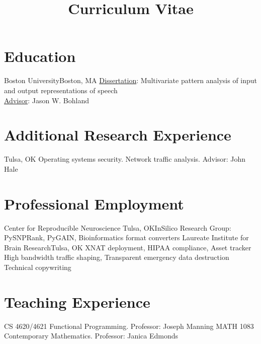 \documentclass[11pt,letterpaper,sans]{moderncv}
\title{Curriculum Vitae}
\begin{document}
\makecvtitle

\vspace{-1em}
\section{Education}
%
    {Boston University}{Boston, MA}{}%
    {\underline{Dissertation}: Multivariate pattern analysis of input and output
     representations of speech\\
     \underline{Advisor}: Jason W. Bohland}

\section{Additional Research Experience}
%
    {Tulsa, OK}{}%
    {Operating systems security. Network traffic analysis. Advisor: John Hale}

\section{Professional Employment}
%
    {Center for Reproducible Neuroscience}
%
    {Tulsa, OK}{}{InSilico Research Group: PySNPRank, PyGAIN, Bioinformatics format converters}
%
    {Laureate Institute for Brain Research}{Tulsa, OK}{}%
    {XNAT deployment, HIPAA compliance, Asset tracker}
%
    {High bandwidth traffic shaping, Transparent emergency data destruction}
%
    {Technical copywriting}

\section{Teaching Experience}
%
    {CS 4620/4621 Functional Programming. Professor: Joseph Manning}
%
    {MATH 1083 Contemporary Mathematics. Professor: Janica Edmonds}
\end{document}
